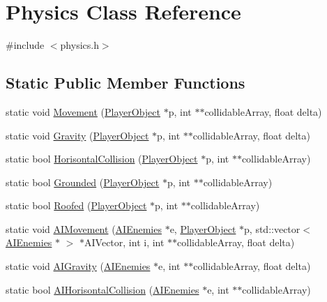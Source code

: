 \hypertarget{classPhysics}{}\section{Physics Class Reference}
\label{classPhysics}


{\ttfamily \#include $<$physics.\+h$>$}

\subsection*{Static Public Member Functions}
\begin{DoxyCompactItemize}
\item 
static void \hyperlink{classPhysics_a3412d3dfdefa125e323e687b54f4c47c}{Movement} (\hyperlink{classPlayerObject}{Player\+Object} $\ast$p, int $\ast$$\ast$collidable\+Array, float delta)
\item 
static void \hyperlink{classPhysics_a21ef38d9416b993c722f9e9b5b35b6a3}{Gravity} (\hyperlink{classPlayerObject}{Player\+Object} $\ast$p, int $\ast$$\ast$collidable\+Array, float delta)
\item 
static bool \hyperlink{classPhysics_af157553200ef95fec909e0e63b534a02}{Horisontal\+Collision} (\hyperlink{classPlayerObject}{Player\+Object} $\ast$p, int $\ast$$\ast$collidable\+Array)
\item 
static bool \hyperlink{classPhysics_aba2e0af80edf40eb938413c3f5b84dbf}{Grounded} (\hyperlink{classPlayerObject}{Player\+Object} $\ast$p, int $\ast$$\ast$collidable\+Array)
\item 
static bool \hyperlink{classPhysics_ad95b0cb8eec16acd74177a8d79eb0850}{Roofed} (\hyperlink{classPlayerObject}{Player\+Object} $\ast$p, int $\ast$$\ast$collidable\+Array)
\item 
static void \hyperlink{classPhysics_a57b511f793e822613720cbb5daf1c45f}{A\+I\+Movement} (\hyperlink{classAIEnemies}{A\+I\+Enemies} $\ast$e, \hyperlink{classPlayerObject}{Player\+Object} $\ast$p, std\+::vector$<$ \hyperlink{classAIEnemies}{A\+I\+Enemies} $\ast$ $>$ $\ast$A\+I\+Vector, int i, int $\ast$$\ast$collidable\+Array, float delta)
\item 
static void \hyperlink{classPhysics_aca79931b6bc169345286bbcdffc051d1}{A\+I\+Gravity} (\hyperlink{classAIEnemies}{A\+I\+Enemies} $\ast$e, int $\ast$$\ast$collidable\+Array, float delta)
\item 
static bool \hyperlink{classPhysics_a1655e3e284cf31eeb54502eb9dcc1e78}{A\+I\+Horisontal\+Collision} (\hyperlink{classAIEnemies}{A\+I\+Enemies} $\ast$e, int $\ast$$\ast$collidable\+Array)

\end{DoxyCompactItemize}
